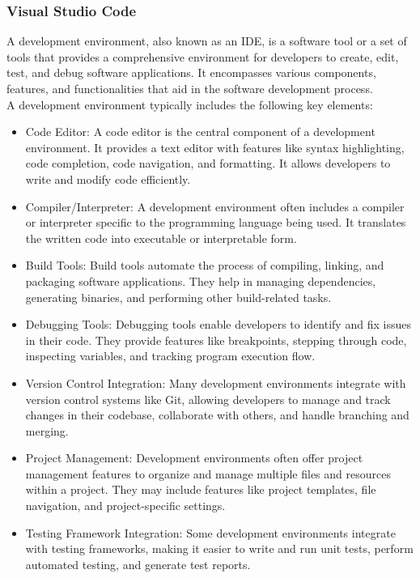 \subsubsection{Visual Studio Code}
A development environment, also known as an \ac{IDE}, is a software tool or a set of tools that provides a comprehensive environment for developers to create, edit, test, and debug software applications. It encompasses various components, features, and functionalities that aid in the software development process.\vspace{5mm} \\
A development environment typically includes the following key elements:
\begin{itemize}
  \item Code Editor: A code editor is the central component of a development environment. It provides a text editor with features like syntax highlighting, code completion, code navigation, and formatting. It allows developers to write and modify code efficiently.
  \item Compiler/Interpreter: A development environment often includes a compiler or interpreter specific to the programming language being used. It translates the written code into executable or interpretable form.
  \item Build Tools: Build tools automate the process of compiling, linking, and packaging software applications. They help in managing dependencies, generating binaries, and performing other build-related tasks.
  \item Debugging Tools: Debugging tools enable developers to identify and fix issues in their code. They provide features like breakpoints, stepping through code, inspecting variables, and tracking program execution flow.
  \item Version Control Integration: Many development environments integrate with version control systems like Git, allowing developers to manage and track changes in their codebase, collaborate with others, and handle branching and merging.
  \item Project Management: Development environments often offer project management features to organize and manage multiple files and resources within a project. They may include features like project templates, file navigation, and project-specific settings.
  \item Testing Framework Integration: Some development environments integrate with testing frameworks, making it easier to write and run unit tests, perform automated testing, and generate test reports.

\end{itemize}
